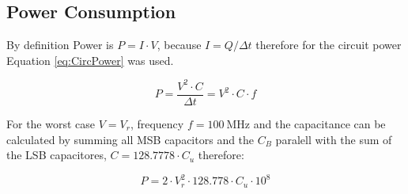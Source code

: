 \subsection{Power Consumption}

By definition Power is $P = I\cdot V$, because $I = Q / \Delta t$ therefore for the circuit power Equation \ref{eq:CircPower} was used.

\begin{equation}
    P = \frac{V^2 \cdot C }{\Delta t} = V^2 \cdot C \cdot f
    \label{eq:CircPower}
\end{equation}

For the worst case $V = V_{r}$, frequency $f = \SI{100}{\mega\hertz}$ and the capacitance can be calculated by summing all MSB capacitors and the $C_B$ paralell with the sum of the LSB capacitores, $C = 128.7778\cdot C_u$ therefore:

\begin{equation}
    P = 2\cdot V_{r}^2 \cdot 128.778\cdot C_u \cdot 10^8
\end{equation}
